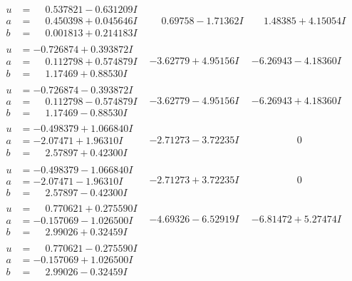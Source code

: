 \documentclass[1p]{elsarticle_modified}
\theoremstyle{definition}
\begin{document}
$$\begin{array}{c|c|c}
\begin{aligned}
u &= \phantom{-}0.537821 - 0.631209 I \\
a &= \phantom{-}0.450398 + 0.045646 I \\
b &= \phantom{-}0.001813 + 0.214183 I\end{aligned}
 & \phantom{-}0.69758 - 1.71362 I & \phantom{-}1.48385 + 4.15054 I \\ \hline\begin{aligned}
u &= -0.726874 + 0.393872 I \\
a &= \phantom{-}0.112798 + 0.574879 I \\
b &= \phantom{-}1.17469 + 0.88530 I\end{aligned}
 & -3.62779 + 4.95156 I & -6.26943 - 4.18360 I \\ \hline\begin{aligned}
u &= -0.726874 - 0.393872 I \\
a &= \phantom{-}0.112798 - 0.574879 I \\
b &= \phantom{-}1.17469 - 0.88530 I\end{aligned}
 & -3.62779 - 4.95156 I & -6.26943 + 4.18360 I \\ \hline\begin{aligned}
u &= -0.498379 + 1.066840 I \\
a &= -2.07471 + 1.96310 I \\
b &= \phantom{-}2.57897 + 0.42300 I\end{aligned}
 & -2.71273 - 3.72235 I & \phantom{-0.000000 } 0 \\ \hline\begin{aligned}
u &= -0.498379 - 1.066840 I \\
a &= -2.07471 - 1.96310 I \\
b &= \phantom{-}2.57897 - 0.42300 I\end{aligned}
 & -2.71273 + 3.72235 I & \phantom{-0.000000 } 0 \\ \hline\begin{aligned}
u &= \phantom{-}0.770621 + 0.275590 I \\
a &= -0.157069 - 1.026500 I \\
b &= \phantom{-}2.99026 + 0.32459 I\end{aligned}
 & -4.69326 - 6.52919 I & -6.81472 + 5.27474 I \\ \hline\begin{aligned}
u &= \phantom{-}0.770621 - 0.275590 I \\
a &= -0.157069 + 1.026500 I \\
b &= \phantom{-}2.99026 - 0.32459 I\end{aligned}

\end{array}$$
\end{document}
